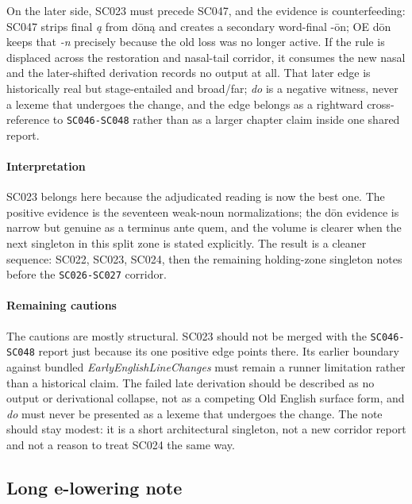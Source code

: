 \documentclass[
  british,
  a4paper,
]{article}
\begin{document}
On the later side, SC023 must precede SC047, and the evidence is
counterfeeding: SC047 strips final \emph{ą} from dōną and creates a
secondary word-final -ōn; OE dōn keeps that \emph{-n} precisely because
the old loss was no longer active. If the rule is displaced across the
restoration and nasal-tail corridor, it consumes the new nasal and the
later-shifted derivation records no output at all. That later edge is
historically real but stage-entailed and broad/far; \emph{do} is a
negative witness, never a lexeme that undergoes the change, and the edge
belongs as a rightward cross-reference to \texttt{SC046-SC048} rather
than as a larger chapter claim inside one shared report.

\paragraph{Interpretation}\label{interpretation-16}

SC023 belongs here because the adjudicated reading is now the best one.
The positive evidence is the seventeen weak-noun normalizations; the dōn
evidence is narrow but genuine as a terminus ante quem, and the volume
is clearer when the next singleton in this split zone is stated
explicitly. The result is a cleaner sequence: SC022, SC023, SC024, then
the remaining holding-zone singleton notes before the
\texttt{SC026-SC027} corridor.

\paragraph{Remaining cautions}\label{remaining-cautions-16}

The cautions are mostly structural. SC023 should not be merged with the
\texttt{SC046-SC048} report just because its one positive edge points
there. Its earlier boundary against bundled
\emph{EarlyEnglishLineChanges} must remain a runner limitation rather
than a historical claim. The failed late derivation should be described
as no output or derivational collapse, not as a competing Old English
surface form, and \emph{do} must never be presented as a lexeme that
undergoes the change. The note should stay modest: it is a short
architectural singleton, not a new corridor report and not a reason to
treat SC024 the same way.

\subsection{Long e-lowering note}\label{long-e-lowering-note}
\end{document}
